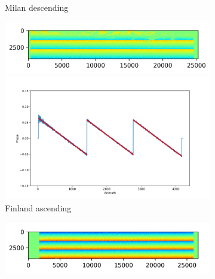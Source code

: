 \documentclass[a4paper,fleqn]{cas-sc}
\begin{document}
\begin{figure}
\begin{subfigure}{0.5\textwidth}
\begin{minipage}{0.5\textwidth}
        \end{minipage}
        \caption{Milan descending}
        \label{fig_5g}
    \end{subfigure}%
    \hfill
    \begin{subfigure}{0.5\textwidth}
        \centering
        \begin{minipage}{0.5\textwidth}
            \centering
            \includegraphics[width=\textwidth]{figure/The cross-interferogram/cross_interf_Finland_asc.png}
        \end{minipage}%
        \begin{minipage}{0.5\textwidth}
            \centering
            \includegraphics[width=\textwidth]{figure/The cross-interferogram/cross_interf_Finland_asc_row&fitted_20230102.png}
        \end{minipage}
        \caption{Finland ascending}
        \label{fig_5h}
    \end{subfigure}%
    \begin{subfigure}{0.5\textwidth}
        \centering
        \begin{minipage}{0.5\textwidth}
            \centering
            \includegraphics[width=\textwidth]{figure/The cross-interferogram/cross_interf_Finland_des.png}

\end{minipage}
\end{subfigure}
\end{figure}
\end{document}
